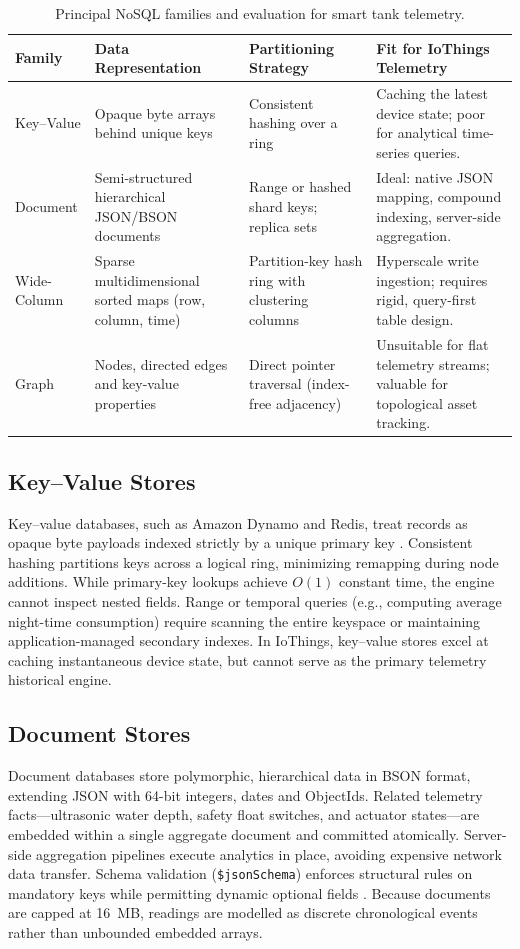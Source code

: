 \documentclass[11pt,a4paper]{article}
\begin{document}
\begin{table}[htbp]
\centering\small
\caption{Principal NoSQL families and evaluation for smart tank telemetry.}\label{tab:families}
\renewcommand{\arraystretch}{1.3}
\begin{tabularx}{\textwidth}{|l|Y|Y|Y|}
\hline
\textbf{Family} & \textbf{Data Representation} & \textbf{Partitioning Strategy} & \textbf{Fit for IoThings Telemetry}\\
\hline
Key--Value & Opaque byte arrays behind unique keys & Consistent hashing over a ring & Caching the latest device state; poor for analytical time-series queries.\\
\hline
Document & Semi-structured hierarchical JSON/BSON documents & Range or hashed shard keys; replica sets & Ideal: native JSON mapping, compound indexing, server-side aggregation.\\
\hline
Wide-Column & Sparse multidimensional sorted maps (row, column, time) & Partition-key hash ring with clustering columns & Hyperscale write ingestion; requires rigid, query-first table design.\\
\hline
Graph & Nodes, directed edges and key-value properties & Direct pointer traversal (index-free adjacency) & Unsuitable for flat telemetry streams; valuable for topological asset tracking.\\
\hline
\end{tabularx}
\end{table}

\subsection{Key--Value Stores}
Key--value databases, such as Amazon Dynamo and Redis, treat records as opaque byte payloads indexed strictly by a unique primary key \citep{decandia2007}. Consistent hashing partitions keys across a logical ring, minimizing remapping during node additions. While primary-key lookups achieve $O(1)$ constant time, the engine cannot inspect nested fields. Range or temporal queries (e.g., computing average night-time consumption) require scanning the entire keyspace or maintaining application-managed secondary indexes. In IoThings, key--value stores excel at caching instantaneous device state, but cannot serve as the primary telemetry historical engine.

\subsection{Document Stores}
Document databases store polymorphic, hierarchical data in BSON format, extending JSON with 64-bit integers, dates and ObjectIds. Related telemetry facts---ultrasonic water depth, safety float switches, and actuator states---are embedded within a single aggregate document and committed atomically. Server-side aggregation pipelines execute analytics in place, avoiding expensive network data transfer. Schema validation (\texttt{\$jsonSchema}) enforces structural rules on mandatory keys while permitting dynamic optional fields \citep{mongoVal}. Because documents are capped at 16~MB, readings are modelled as discrete chronological events rather than unbounded embedded arrays.
\end{document}
